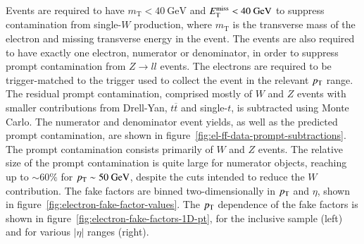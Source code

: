 Events are required to have $m_{\mathrm{T}}<40~\mbox{GeV}$ and $E_{\text{T}}^{\text{miss}}<40~\mbox{GeV}$ to suppress contamination from single-$W$ production, where $m_{\mathrm{T}}$ is the transverse mass of the electron and missing transverse energy in the event. The events are also required to have exactly one electron, numerator or denominator, in order to suppress prompt contamination from $Z\rightarrow ll$ events. The electrons are required to be trigger-matched to the trigger used to collect the event in the relevant $p_{\text{T}}$ range. The residual prompt contamination, comprised mostly of $W$ and $Z$ events with smaller contributions from Drell-Yan, $t\overline{t}$ and single-$t$, is subtracted using Monte Carlo. The numerator and denominator event yields, as well as the predicted prompt contamination, are shown in figure~\ref{fig:el-ff-data-prompt-subtractions}. The prompt contamination consists primarily of $W$ and $Z$ events. The relative size of the prompt contamination is quite large for numerator objects, reaching up to $\sim60\%$ for $p_{\text{T}}\sim 50~\mbox{GeV}$, despite the cuts intended to reduce the $W$ contribution. The fake factors are binned two-dimensionally in $p_{\text{T}}$ and $\eta$, shown in figure~\ref{fig:electron-fake-factor-values}. The $p_{\text{T}}$ dependence of the fake factors is shown in figure~\ref{fig:electron-fake-factors-1D-pt}, for the inclusive sample (left) and for various $|\eta|$ ranges (right).

